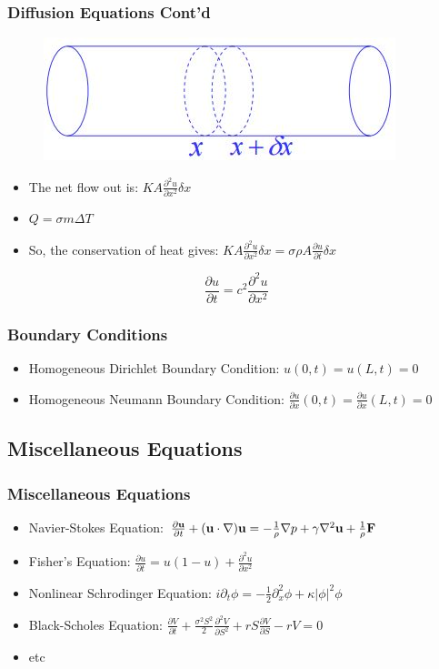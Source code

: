 \documentclass{beamer}
\begin{document}
\begin{frame}
\frametitle{Diffusion Equations Cont'd}
\begin{figure}
\includegraphics[width=0.4\linewidth]{heat3.jpg}
\end{figure}
\begin{itemize}
\item The net flow out is: $KA\frac{\partial^2 u}{\partial x^2}\delta x$\\
\item $Q = \sigma m \Delta T$\\
\item So, the conservation of heat gives: $KA\frac{\partial^2 u}{\partial x^2}\delta x=\sigma \rho A \frac{\partial u}{\partial t}\delta x$
\end{itemize}
$$\boxed{\frac{\partial u}{\partial t}=c^2\frac{\partial^2 u}{\partial x^2}}$$
\end{frame}

\begin{frame}
\frametitle{Boundary Conditions}
\begin{itemize}
\item Homogeneous Dirichlet Boundary Condition: $u(0,t)=u(L,t)=0$

\item Homogeneous Neumann Boundary Condition: $\frac{\partial u}{\partial x}(0,t)=\frac{\partial u}{\partial x}(L,t)=0$
\end{itemize}
\end{frame}
\subsection{Miscellaneous Equations}
\begin{frame}
\frametitle{Miscellaneous Equations}
\begin{itemize}
\item Navier-Stokes Equation: ${\partial{\bf u}\over{\partial t}} + ({\bf u} \cdot \nabla) {\bf u} = - {1\over\rho} \nabla p + \gamma\nabla^2{\bf u} + {1\over\rho}{\bf F}$
\item Fisher's Equation: $\frac{\partial u}{\partial t}= u(1-u)+\frac{\partial^2 u}{\partial x^2}$
\item Nonlinear Schrodinger Equation: $ i\partial_t\phi=-\frac{1}{2}\partial_x^2\phi+\kappa|\phi|^2\phi$
\item Black-Scholes Equation: $\frac{\partial V}{\partial t}
+ \frac{\sigma^2 S^2}{2} \frac{\partial^2 V}{\partial S^2}
+ r S \frac{\partial V}{\partial S} - rV = 0$
\item etc
\end{itemize}
\end{frame}
\end{document}
